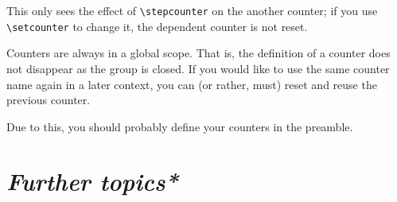 \begin{gotcha}
This only sees the effect of \verb|\stepcounter| on the another counter;
if you use \verb|\setcounter| to change it, the dependent counter is not reset.
\end{gotcha}


\begin{technote}
Counters are always in a global scope.
That is, the definition of a counter does not disappear as the group is closed.
If you would like to use the same counter name again in a later context,
you can (or rather, must) reset and reuse the previous counter.

Due to this, you should probably define your counters in the preamble.
\end{technote}


%
%
%
\section{\emph{Further topics*}}





